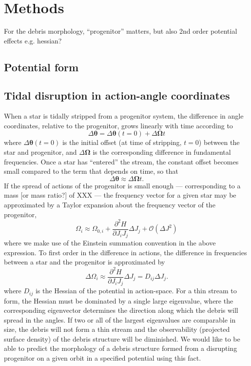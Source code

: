 \documentclass[letterpaper,12pt,preprint]{aastex}
\newcommand{\bs}[1]{\boldsymbol{#1}}
\begin{document}
\section{Methods}\label{sec:methods}

For the debris morphology, ``progenitor'' matters, but also 2nd order potential effects e.g. hessian?

\subsection{Potential form}

\subsection{Tidal disruption in action-angle coordinates}
When a star is tidally stripped from a progenitor system, the difference in angle coordinates, relative to the progenitor, grows linearly with time according to
\begin{equation}
	\Delta\bs{\theta} = \Delta\bs{\theta}(t=0) + \Delta\bs{\Omega}t
\end{equation}
where $\Delta\bs{\theta}(t=0)$ is the initial offset (at time of stripping, $t=0$) between the star and progenitor, and $\Delta\bs{\Omega}$ is the corresponding difference in fundamental frequencies. Once a star has ``entered'' the stream, the constant offset becomes small compared to the term that depends on time, so that
\begin{equation}
	\Delta\bs{\theta} \approx \Delta\bs{\Omega}t.
\end{equation}
If the spread of actions of the progenitor is small enough --- corresponding to a mass [or mass ratio?] of XXX --- the frequency vector for a given star may be approximated by a Taylor expansion about the frequency vector of the progenitor,
\begin{equation}
	\Omega_i \approx \Omega_{0,i} + \frac{\partial^2 H}{\partial J_i J_j}\Delta J_j + \mathcal{O}(\Delta J^2)
\end{equation}
where we make use of the Einstein summation convention in the above expression. To first order in the difference in actions, the difference in frequencies between a star and the progenitor is approximated by
\begin{equation}
	\Delta\Omega_i \approx \frac{\partial^2 H}{\partial J_i J_j}\Delta J_j = D_{ij}\Delta J_j.\label{eq:deltafreq}
\end{equation}
where $D_{ij}$ is the Hessian of the potential in action-space. For a thin stream to form, the Hessian must be dominated by a single large eigenvalue, where the corresponding eigenvector determines the direction along which the debris will spread in the angles. If two or all of the largest eigenvalues are comparable in size, the debris will not form a thin stream and the observability (projected surface density) of the debris structure will be diminished. We would like to be able to predict the morphology of a debris structure formed from a disrupting progenitor on a given orbit in a specified potential using this fact.
\end{document}
